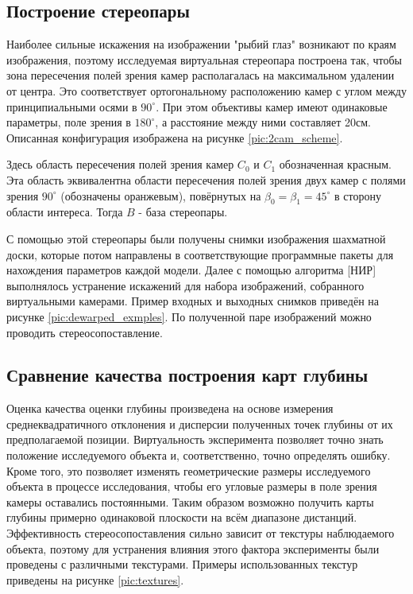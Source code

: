 
\subsection{Построение стереопары}

Наиболее сильные искажения на изображении "рыбий глаз" возникают по краям изображения, поэтому исследуемая виртуальная стереопара построена так,
чтобы зона пересечения полей зрения камер располагалась на максимальном удалении от центра. Это соответствует ортогональному расположению
камер с углом между принципиальными осями в $90^\circ$.  При этом объективы камер имеют одинаковые параметры, поле зрения в $180^\circ$,
 а расстояние между ними составляет 20см. Описанная конфигурация изображена на рисунке \ref{pic:2cam_scheme}.

Здесь область пересечения полей зрения камер $C_0$ и $C_1$ обозначенная красным.
Эта область эквивалентна области пересечения полей зрения двух камер с полями зрения $90^\circ$ (обозначены
оранжевым), повёрнутых на $\beta_0 = \beta_1  = 45^\circ$ в сторону области интереса. Тогда $B$ - база стереопары.

С помощью этой стереопары были получены снимки изображения шахматной доски, 
которые потом  направлены в соответствующие программные пакеты для нахождения параметров каждой модели. Далее с помощью алгоритма [НИР]				%
выполнялось устранение искажений для набора изображений, собранного виртуальными камерами. Пример входных и выходных снимков приведён на
рисунке \ref{pic:dewarped_exmples}.  По полученной паре изображений можно проводить стереосопоставление.



\subsection{Сравнение качества построения карт глубины}

Оценка качества оценки глубины произведена на основе измерения среднеквадратичного отклонения и дисперсии полученных точек 
глубины от их предполагаемой позиции. Виртуальность эксперимента позволяет точно знать положение исследуемого объекта и, соответственно, 
точно определять ошибку. Кроме того, это позволяет изменять геометрические размеры исследуемого объекта в процессе исследования, чтобы его
угловые размеры в поле зрения камеры оставались постоянными. Таким образом возможно получить карты глубины примерно одинаковой 
плоскости на всём диапазоне дистанций.  Эффективность стереосопоставления \cite{SGBM} сильно зависит от текстуры наблюдаемого объекта, 
поэтому для устранения влияния этого фактора эксперименты были проведены с различными текстурами. 
Примеры использованных текстур приведены на рисунке \ref{pic:textures}. 

